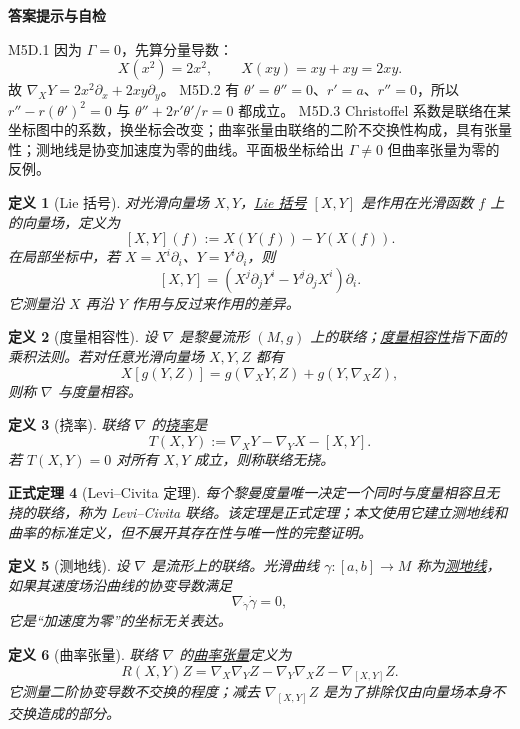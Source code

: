 \documentclass[UTF8,fontset=none,a4paper,11pt]{ctexart}
\theoremstyle{foundation-definition}
\newtheorem{definition}{定义}[section]
\theoremstyle{foundation-theorem}
\newtheorem{theorem}[definition]{正式定理}
\theoremstyle{foundation-proposition}
\theoremstyle{foundation-example}
\theoremstyle{foundation-remark}
\theoremstyle{foundation-theorem}
\newcommand{\term}[2]{\hyperref[#1]{#2}}
\newenvironment{answerkey}{%
\begin{mdframed}[backgroundcolor=examplebg,linecolor=examplepurple,linewidth=1.0pt,
  leftline=true,rightline=false,topline=false,bottomline=false,
  skipabove=7pt,skipbelow=8pt,innerleftmargin=10pt,innerrightmargin=8pt,
  innertopmargin=6pt,innerbottommargin=6pt]
{\sffamily\bfseries\color{examplepurple}答案提示与自检}\par\smallskip\small
}{\end{mdframed}}
\begin{document}
\begin{answerkey}
M5D.1 因为 \(\Gamma=0\)，先算分量导数：
\[
X(x^2)=2x^2,\qquad X(xy)=xy+xy=2xy.
\]
故 \(\nabla_XY=2x^2\partial_x+2xy\partial_y\)。
M5D.2 有 \(\theta'=\theta''=0\)、\(r'=a\)、\(r''=0\)，所以
\(r''-r(\theta')^2=0\) 与 \(\theta''+2r'\theta'/r=0\) 都成立。
M5D.3 Christoffel 系数是联络在某坐标图中的系数，换坐标会改变；曲率张量由联络的二阶不交换性构成，具有张量性；测地线是协变加速度为零的曲线。平面极坐标给出 \(\Gamma\neq0\) 但曲率张量为零的反例。
\end{answerkey}

\begin{definition}[Lie 括号]\label{def:lie-bracket}
对光滑向量场 \(X,Y\)，\term{def:lie-bracket}{Lie 括号} \([X,Y]\) 是作用在光滑函数 \(f\) 上的向量场，定义为
\[
[X,Y](f):=X(Y(f))-Y(X(f)).
\]
在局部坐标中，若 \(X=X^i\partial_i\)、\(Y=Y^i\partial_i\)，则
\[
[X,Y]=(X^j\partial_jY^i-Y^j\partial_jX^i)\partial_i.
\]
它测量沿 \(X\) 再沿 \(Y\) 作用与反过来作用的差异。
\end{definition}

\begin{definition}[度量相容性]\label{def:metric-compatibility}
设 \(\nabla\) 是黎曼流形 \((M,g)\) 上的联络；\term{def:metric-compatibility}{度量相容性}指下面的乘积法则。若对任意光滑向量场 \(X,Y,Z\) 都有
\[
X[g(Y,Z)]=g(\nabla_XY,Z)+g(Y,\nabla_XZ),
\]
则称 \(\nabla\) 与度量相容。
\end{definition}

\begin{definition}[挠率]\label{def:torsion}
联络 \(\nabla\) 的\term{def:torsion}{挠率}是
\[
T(X,Y):=\nabla_XY-\nabla_YX-[X,Y].
\]
若 \(T(X,Y)=0\) 对所有 \(X,Y\) 成立，则称联络无挠。
\end{definition}

\begin{theorem}[Levi--Civita 定理]
每个黎曼度量唯一决定一个同时与度量相容且无挠的联络，称为 Levi--Civita 联络。该定理是正式定理；本文使用它建立测地线和曲率的标准定义，但不展开其存在性与唯一性的完整证明。
\end{theorem}

\begin{definition}[测地线]\label{def:geodesic}
设 \(\nabla\) 是流形上的联络。光滑曲线 \(\gamma:[a,b]\to M\) 称为\term{def:geodesic}{测地线}，如果其速度场沿曲线的协变导数满足
\[
\nabla_{\dot\gamma}\dot\gamma=0,
\]
它是“加速度为零”的坐标无关表达。
\end{definition}

\begin{definition}[曲率张量]\label{def:curvature-tensor}
联络 \(\nabla\) 的\term{def:curvature-tensor}{曲率张量}定义为
\[
R(X,Y)Z=\nabla_X\nabla_YZ-\nabla_Y\nabla_XZ-\nabla_{[X,Y]}Z.
\]
它测量二阶协变导数不交换的程度；减去 \(\nabla_{[X,Y]}Z\) 是为了排除仅由向量场本身不交换造成的部分。
\end{definition}
\end{document}
